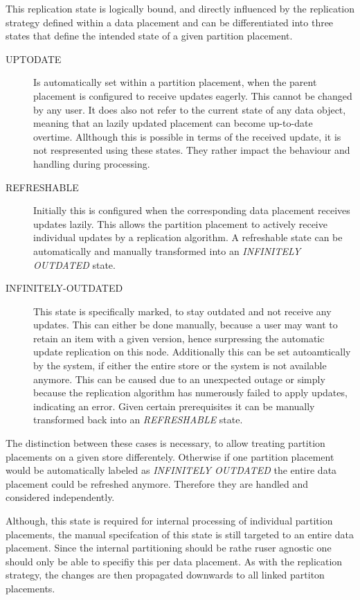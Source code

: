 This replication state is logically bound, and directly influenced by the replication strategy defined within a data placement
and can be differentiated into three states that define the intended state of a given partition placement. 
\begin{description}
    \item [UPTODATE] Is automatically set within a partition placement, when the parent placement is configured to receive updates eagerly.
    This cannot be changed by any user. It does also not refer to the current state of any data object, meaning that an lazily updated placement can become up-to-date overtime.
    Allthough this is possible in terms of the received update, it is not respresented using these states. They rather impact the behaviour and handling during processing.
    
    \item [REFRESHABLE] Initially this is configured when the corresponding data placement receives updates lazily. This allows the partition placement to actively receive 
    individual updates by a replication algorithm. A refreshable state can be automatically and manually transformed into an \emph{INFINITELY OUTDATED} state.

    \item [INFINITELY-OUTDATED] This state is specifically marked, to stay outdated and not receive any updates. This can either be done manually, because a user may want to
    retain an item with a given version, hence surpressing the automatic update replication on this node. Additionally this can be set autoamtically by the system, 
    if either the entire store or the system is not available anymore. This can be caused due to an unexpected outage or simply because the replication algorithm has 
    numerously failed to apply updates, indicating an error. Given certain prerequisites it can be manually transformed back into an \emph{REFRESHABLE} state.

\end{description}

The distinction between these cases is necessary, to allow treating partition placements on a given store differentely. 
Otherwise if one partition placement would be automatically labeled as \emph{INFINITELY OUTDATED} the entire data placement could be refreshed anymore.
Therefore they are handled and considered independently.

Although, this state is required for internal processing of individual partition placements, the manual specifcation of this state is still targeted to an entire data placement.
Since the internal partitioning should be rathe ruser agnostic one should only be able to specifiy this per data placement. 
As with the replication strategy, the changes are then propagated downwards to all linked partiton placements. 

